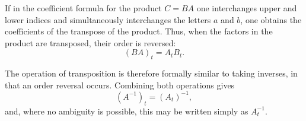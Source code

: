 \documentclass[11pt]{article}
\begin{document}
If in the coefficient formula for the product $C=BA$ one interchanges upper and lower indices and simultaneously interchanges the letters $a$ and $b$, one obtains the coefficients of the transpose of the product.  Thus, when the factors in the product are transposed, their order is reversed:
\begin{equation}\label{eq:weber8-transpose-product}
(BA)_t=A_tB_t.
\end{equation}

The operation of transposition is therefore formally similar to taking inverses, in that an order reversal occurs.  Combining both operations gives
\begin{equation}\label{eq:weber8-inverse-transpose}
(A^{-1})_t=(A_t)^{-1},
\end{equation}
and, where no ambiguity is possible, this may be written simply as $A_t^{-1}$.
\end{document}
